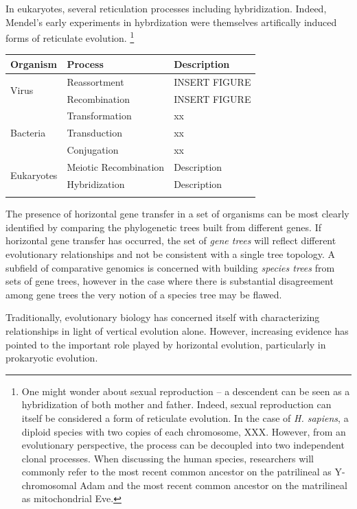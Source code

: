 In eukaryotes, several reticulation processes including hybridization.
Indeed, Mendel's early experiments in hybrdization were themselves artifically induced forms of reticulate evolution.
\footnote{One might wonder about sexual reproduction -- a descendent can be seen as a hybridization of both mother and father. Indeed, sexual reproduction can itself be considered a form of reticulate evolution. In the case of \emph{H. sapiens}, a diploid species with two copies of each chromosome, XXX. However, from an evolutionary perspective, the process can be decoupled into two independent clonal processes. When discussing the human species, researchers will commonly refer to the most recent common ancestor on the patrilineal as Y-chromosomal Adam and the most recent common ancestor on the matrilineal as mitochondrial Eve.}

\begin{tabularx}{\textwidth}{lll}
\toprule
Organism & Process & Description \\
\midrule
\multirow{2}{*}{Virus} & Reassortment & INSERT FIGURE \\
                       & Recombination & INSERT FIGURE \\
\midrule
\multirow{3}{*}{Bacteria} & Transformation & xx \\
                          & Transduction   & xx \\
                          & Conjugation    & xx \\
\midrule
\multirow{2}{*}{Eukaryotes} & Meiotic Recombination & Description \\
                            & Hybridization         & Description \\
\bottomrule
\label{table:reticulation_processes}
\end{tabularx}

The presence of horizontal gene transfer in a set of organisms can be most clearly identified by comparing the phylogenetic trees built from different genes.
If horizontal gene transfer has occurred, the set of \emph{gene trees} will reflect different evolutionary relationships and not be consistent with a single tree topology.
A subfield of comparative genomics is concerned with building \emph{species trees} from sets of gene trees, however in the case where there is substantial disagreement among gene trees the very notion of a species tree may be flawed.

Traditionally, evolutionary biology has concerned itself with characterizing relationships in light of vertical evolution alone.
However, increasing evidence  has pointed to the important role played by horizontal evolution, particularly in prokaryotic evolution.

